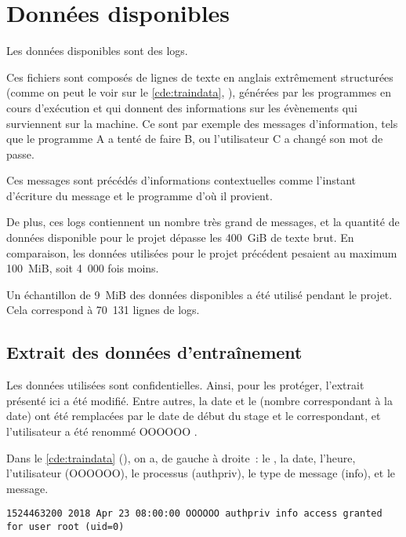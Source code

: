 \chapter{Données disponibles}\label{ch:data_papud}
Les données disponibles sont des \glspl{log}. \label{def:log}

Ces fichiers sont composés de lignes de texte en anglais extrêmement structurées (comme on peut le voir sur le \autoref{cde:traindata}, ), générées par les programmes en cours d'exécution et qui donnent des informations sur les évènements qui surviennent sur la machine.
Ce sont par exemple des messages d'information, tels que \og le programme A a tenté de faire B\fg{}, ou \og l'utilisateur C a changé son mot de passe\fg{}.

Ces messages sont précédés d'informations contextuelles comme l'instant d'écriture du message et le programme d'où il provient.

De plus, ces \glspl{log} contiennent un nombre très grand de messages, et la quantité de données disponible pour le projet dépasse les 400~GiB de texte brut. En comparaison, les données utilisées pour le projet précédent pesaient au maximum 100~MiB, soit 4~000 fois moins.

Un échantillon de 9~MiB des données disponibles a été utilisé pendant le projet.
Cela correspond à 70~131 lignes de \glspl{log}.

\section{Extrait des données d'entraînement}%
Les données utilisées sont confidentielles.
Ainsi, pour les protéger, l'extrait présenté ici a été modifié.
Entre autres, la date et le  (nombre correspondant à la date) ont été remplacées par le date de début du stage et le  correspondant, et l'utilisateur a été renommé \og OOOOOO \fg{}.

Dans le \autoref{cde:traindata} (), on a, de gauche à droite~: le , la date, l'heure, l'utilisateur (OOOOOO), le processus (authpriv), le type de message (info), et le message.

\begin{lstlisting}[caption={Exemple de ligne extraite d'un des fichiers de journalisation},label=cde:traindata]
	1524463200 2018 Apr 23 08:00:00 OOOOOO authpriv info access granted for user root (uid=0)
\end{lstlisting}

